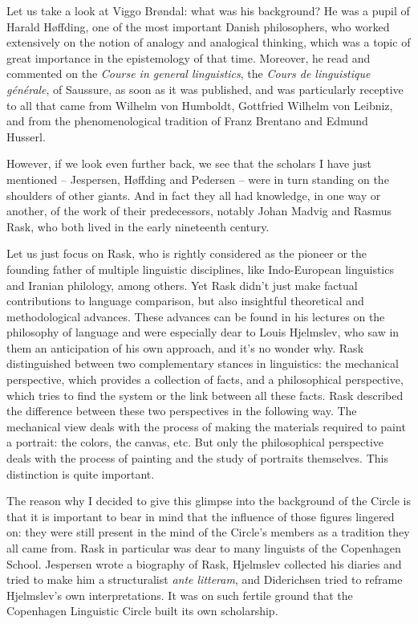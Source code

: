 \documentclass[output=paper]{langscibook}
\begin{document}
Let us take a look at Viggo Brøndal: what was his background? He was a pupil of Harald Høffding, one of the most important Danish philosophers, who worked extensively on the notion of analogy and analogical thinking, which was a topic of great importance in the epistemology of that time. Moreover, he read and commented on the \textit{Course in general linguistics}, the \textit{Cours de linguistique générale}, of Saussure, as soon as it was published, and was particularly receptive to all that came from Wilhelm von Humboldt, Gottfried Wilhelm von Leibniz, and from the phenomenological tradition of Franz Brentano and Edmund Husserl. 

However, if we look even further back, we see that the scholars I have just mentioned – Jespersen, Høffding and Pedersen – were in turn standing on the shoulders of other giants. And in fact they all had knowledge, in one way or another, of the work of their predecessors, notably Johan Madvig and Rasmus Rask, who both lived in the early nineteenth century. 

Let us just focus on Rask, who is rightly considered as the pioneer or the founding father of multiple linguistic disciplines, like Indo-European linguistics and Iranian philology, among others. Yet Rask didn’t just make factual contributions to language comparison, but also insightful theoretical and methodological advances. These advances can be found in his lectures on the philosophy of language and were especially dear to Louis Hjelmslev, who saw in them an anticipation of his own approach, and it’s no wonder why. Rask distinguished between two complementary stances in linguistics: the mechanical perspective, which provides a collection of facts, and a philosophical perspective, which tries to find the system or the link between all these facts. Rask described the difference between these two perspectives in the following way. The mechanical view deals with the process of making the materials required to paint a portrait: the colors, the canvas, etc. But only the philosophical perspective deals with the process of painting and the study of portraits themselves. This distinction is quite important. 

The reason why I decided to give this glimpse into the background of the Circle is that it is important to bear in mind that the influence of those figures lingered on: they were still present in the mind of the Circle’s members as a tradition they all came from. Rask in particular was dear to many linguists of the Copenhagen School. Jespersen wrote a biography of Rask, Hjelmslev collected his diaries and tried to make him a structuralist \textit{ante litteram}, and Diderichsen tried to reframe Hjelmslev’s own interpretations. It was on such fertile ground that the Copenhagen Linguistic Circle built its own scholarship. 
\end{document}
